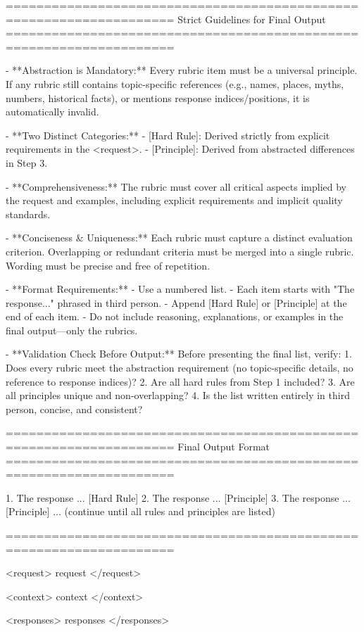\begin{tcblisting}
====================================================================
Strict Guidelines for Final Output
====================================================================

- **Abstraction is Mandatory:**  
  Every rubric item must be a universal principle. If any rubric still contains topic-specific references (e.g., names, places, myths, numbers, historical facts), or mentions response indices/positions, it is automatically invalid.

- **Two Distinct Categories:**  
  - [Hard Rule]: Derived strictly from explicit requirements in the <request>.  
  - [Principle]: Derived from abstracted differences in Step 3.  

- **Comprehensiveness:**  
  The rubric must cover all critical aspects implied by the request and examples, including explicit requirements and implicit quality standards.

- **Conciseness & Uniqueness:**  
  Each rubric must capture a distinct evaluation criterion. Overlapping or redundant criteria must be merged into a single rubric. Wording must be precise and free of repetition.

- **Format Requirements:**  
  - Use a numbered list.  
  - Each item starts with "The response..." phrased in third person.  
  - Append [Hard Rule] or [Principle] at the end of each item.  
  - Do not include reasoning, explanations, or examples in the final output—only the rubrics.

- **Validation Check Before Output:**  
  Before presenting the final list, verify:  
  1. Does every rubric meet the abstraction requirement (no topic-specific details, no reference to response indices)?  
  2. Are all hard rules from Step 1 included?  
  3. Are all principles unique and non-overlapping?  
  4. Is the list written entirely in third person, concise, and consistent?

====================================================================
Final Output Format
====================================================================

1. The response ... [Hard Rule]  
2. The response ... [Principle]  
3. The response ... [Principle]  
... (continue until all rules and principles are listed)

====================================================================

<request>
{request}
</request>

<context>
{context}
</context>

<responses>
{responses}
</responses>
\end{tcblisting}
